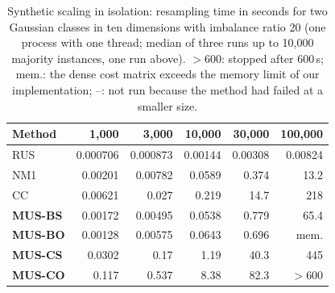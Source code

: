 \begin{table}[t]
\centering
\footnotesize
\caption{Synthetic scaling in isolation: resampling time in seconds for two Gaussian classes in ten dimensions with imbalance ratio 20 (one process with one thread; median of three runs up to 10{,}000 majority instances, one run above). $>$600: stopped after 600\,s; mem.: the dense cost matrix exceeds the memory limit of our implementation; --: not run because the method had failed at a smaller size.}
\label{tab:scaling}
\begin{tabular}{lrrrrr}
\toprule
Method & 1{,}000 & 3{,}000 & 10{,}000 & 30{,}000 & 100{,}000 \\
\midrule
RUS & 0.000706 & 0.000873 & 0.00144 & 0.00308 & 0.00824 \\
NM1 & 0.00201 & 0.00782 & 0.0589 & 0.374 & 13.2 \\
CC & 0.00621 & 0.027 & 0.219 & 14.7 & 218 \\
\textbf{MUS-BS} & 0.00172 & 0.00495 & 0.0538 & 0.779 & 65.4 \\
\textbf{MUS-BO} & 0.00128 & 0.00575 & 0.0643 & 0.696 & mem. \\
\textbf{MUS-CS} & 0.0302 & 0.17 & 1.19 & 40.3 & 445 \\
\textbf{MUS-CO} & 0.117 & 0.537 & 8.38 & 82.3 & $>$600 \\
\bottomrule
\end{tabular}
\end{table}

